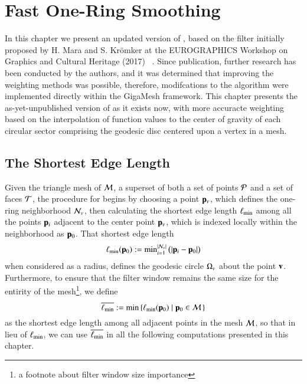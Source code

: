 \chapter{Fast One-Ring Smoothing}
\label{ch4}
In this chapter we present an updated version of , based on the filter initially proposed by H. Mara and S. Krömker at the EUROGRAPHICS Workshop on Graphics and Cultural Heritage (2017) ~\cite[s.~3.2]{Mara17}. Since publication, further research has been conducted by the authors, and it was determined that improving the weighting methods was possible, therefore, modifcations to the algorithm were implemented directly within the GigaMesh  framework. This chapter presents the as-yet-unpublished version of  as it exists now, with more accuracte weighting based on the interpolation of function values to the center of gravity of each circular sector comprising the geodesic disc centered upon a vertex in a mesh.

%
%
%
%
\section{The Shortest Edge Length}
\label{ch4sSEL}
Given the triangle mesh of \tdd{} $\mathcal{M}$, a superset of both a set of points $\mathcal{P}$ and a set of faces $\mathcal{T}$, the procedure for   begins by choosing a point $\mathbf{p}_v$, which defines the one-ring neighborhood $\mathcal{N}_v$, then calculating the shortest edge length $\ell_\text{min}$ among all the points $\mathbf{p}_i$ adjacent to the center point $\mathbf{p}_v$, which  is indexed locally within the neighborhood as $\mathbf{p}_0$. That shortest edge length
%
\begin{equation}
	\ell_\text{min}(\mathbf{p}_0) := \text{min}^{|\mathcal{N}_v|}_{i=1}\,\big(|\mathbf{p}_i - \mathbf{p}_0|\big)
	\label{eq:localMinimumEdgeLength}
\end{equation}%
%
%
%
when considered as a radius, defines the geodesic circle $\Omega_v$ about the point $\mathbf{v}$. Furthermore, to ensure that the filter window remains the same size for the entirity of the mesh\footnote{a footnote about filter window size importance}, we define
%
\begin{equation}
	\overline{\ell_\text{min}} := \min\left \{\ell_\text{min}(\mathbf{p}_0) \;|\; \mathbf{p}_0 \in \mathcal{M}\,\right \}
	\label{eq:globalMinimumEdgeLength}
\end{equation}%
%
%
as the shortest edge length among all adjacent points in the mesh $\mathcal{M}$, so that in lieu of $\ell_\text{min}$, we can use $\overline{\ell_\text{min}}$ in all the following computations presented in this chapter.

